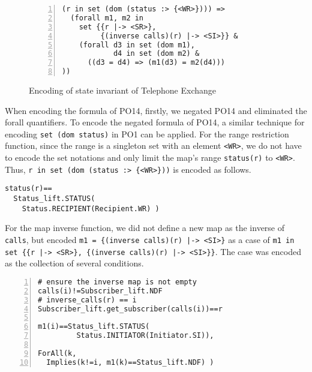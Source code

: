 \begin{figure}[t]
\begin{center}
\begin{mdframed}[roundcorner=5pt]
\begin{Verbatim}[fontsize=\small,numbers=left]
(r in set (dom (status :> {<WR>}))) =>
  (forall m1, m2 in 
    set {{r |-> <SR>}, 
         {(inverse calls)(r) |-> <SI>}} &
    (forall d3 in set (dom m1),
            d4 in set (dom m2) &
      ((d3 = d4) => (m1(d3) = m2(d4)))
))
\end{Verbatim}
\end{mdframed}
\vspace{-10pt}
\caption{Encoding of state invariant of Telephone Exchange}
\label{fig:PO14_case2}
\end{center}
\vspace{-25pt}
\end{figure}

When encoding the formula of PO14, firstly, we negated PO14 and eliminated the forall quantifiers. To encode the negated formula of PO14, a similar technique for  encoding {\tt set (dom status)} in PO1 can be applied. For the range restriction function, since the range is a singleton set with an element {\tt <WR>}, we do not have to encode the set notations and only limit the map's range {\tt status(r)} to {\tt <WR>}. Thus, {\tt r in set (dom (status :> \{<WR>\}))} is encoded as follows.

\begin{mdframed}[roundcorner=5pt,shadow=true]
\begin{Verbatim}[fontsize=\small]
status(r)==
  Status_lift.STATUS(
    Status.RECIPIENT(Recipient.WR) )
\end{Verbatim}
\end{mdframed}

For the map inverse function, we did not define a new map as the inverse of {\tt calls}, but encoded {\tt m1 = \{(inverse calls)(r) |-> <SI>\}} as a case of {\tt m1 in set \{\{r |-> <SR>\}, \{(inverse calls)(r) |-> <SI>\}\}}. The case was encoded as the collection of several conditions. 

\begin{mdframed}[roundcorner=5pt,shadow=true]
\begin{Verbatim}[fontsize=\small,numbers=left]
# ensure the inverse map is not empty
calls(i)!=Subscriber_lift.NDF 
# inverse_calls(r) == i
Subscriber_lift.get_subscriber(calls(i))==r

m1(i)==Status_lift.STATUS(
         Status.INITIATOR(Initiator.SI)),

ForAll(k, 
  Implies(k!=i, m1(k)==Status_lift.NDF) )
\end{Verbatim}
\end{mdframed}

